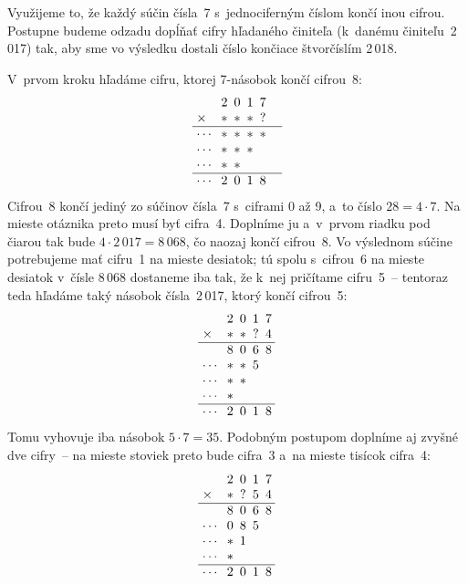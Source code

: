 {%
Využijeme to, že každý súčin čísla~7 s~jednociferným číslom končí inou cifrou.
Postupne budeme odzadu dopĺňať cifry hľadaného činiteľa (k~danému činiteľu~2\,017)
tak, aby sme vo výsledku dostali číslo končiace štvorčíslím 2\,018.

\def\hline{\noalign{\hrule}}
V~prvom kroku hľadáme cifru, ktorej 7-násobok končí cifrou~8:
$$
\vbox{\let\\=\cr
\halign{\strut\ $#$ \hss&&\hbox to1em{\hss$#$\hss}\\
& 2&0&1&7 \\
\times& *&*&*&? \\
\hline
\cdots&*&*&*&*&\\
\cdots&*&*&*&& \\
\cdots&*&*&&& \\
\hline
\cdots&2&0&1&8\\
}}
$$
Cifrou~8 končí jediný zo súčinov čísla~7 s~ciframi 0 až 9, a~to číslo $28=4\cdot7$.
Na mieste otáznika preto musí byť cifra~4. Doplníme
ju a~v~prvom riadku pod čiarou tak bude $4 \cdot 2\,017 = 8\,068$, čo
naozaj končí cifrou~8. Vo výslednom súčine potrebujeme mať cifru~1
na mieste desiatok; tú spolu s~cifrou~6 na mieste desiatok v~čísle
8\,068 dostaneme iba tak, že k~nej pričítame cifru~5~-- tentoraz teda
hľadáme taký násobok čísla~2\,017, ktorý končí cifrou~5:
$$
\vbox{\let\\=\cr
\halign{\strut\ $#$ \hss&&\hbox to1em{\hss$#$\hss}\\
& 2&0&1&7 \\
\times& *&*&?&4 \\
\hline
& 8&0&6&8 \\
\cdots&*&*&5&\\
\cdots&*&*&& \\
\cdots&*&&& \\
\hline
\cdots&2&0&1&8\\
}}
$$
Tomu vyhovuje iba násobok $5 \cdot 7 = 35$.
Podobným postupom doplníme aj zvyšné dve cifry~-- na mieste stoviek preto bude
cifra~3 a~na mieste tisícok cifra~4:
$$
\vbox{\let\\=\cr
\halign{\strut\ $#$ \hss&&\hbox to1em{\hss$#$\hss}\\
& 2&0&1&7 \\
\times& *&?&5&4 \\
\hline
& 8&0&6&8 \\
\cdots& 0&8&5&\\
\cdots& *&1&& \\
\cdots& *&&& \\
\hline
\cdots&2&0&1&8\\
}}$$}
